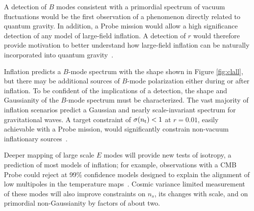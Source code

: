 A detection of $B$ modes consistent with a primordial spectrum of vacuum fluctuations would be the first observation of a phenomenon directly related to quantum gravity. In addition, a Probe mission would allow a high significance detection of any model of large-field inflation.
A detection of $r$ would therefore provide 
motivation to better understand how large-field inflation can be naturally incorporated into quantum gravity~\cite{Banks:2003sx,Baumann:2014nda,Brown:2015iha,Rudelius:2015xta,Silverstein:2008sg,Kaloper:2008fb,Marchesano:2014mla,Blumenhagen:2015xpa}. 

Inflation predicts a $B$-mode spectrum with the shape shown in Figure \ref{fig:clall}, but there may be additional sources 
of $B$-mode polarization either during or after 
inflation. To be confident of the implications of a detection, the shape and Gaussianity of the $B$-mode spectrum 
must be characterized. The vast majority of inflation scenarios predict a Gaussian and nearly scale-invariant spectrum for 
gravitational waves. A target constraint of $\sigma(n_{\rm t})<1$ at $r=0.01$, easily achievable with a Probe mission, would significantly constrain non-vacuum 
inflationary sources~\cite{Namba:2015gja,Peloso:2016gqs}.

Deeper mapping of large scale $E$ modes will provide new tests of isotropy, a prediction of most models of inflation; 
for example, observations with a CMB Probe could reject at 99\% confidence models designed to explain the alignment of low 
multipoles in the temperature maps~\cite{Dvorkin:2007jp}. 
Cosmic variance limited measurement of these modes will also improve constraints on $n_{s}$, 
its changes with scale, and on primordial non-Gaussianity by factors of about two. 

